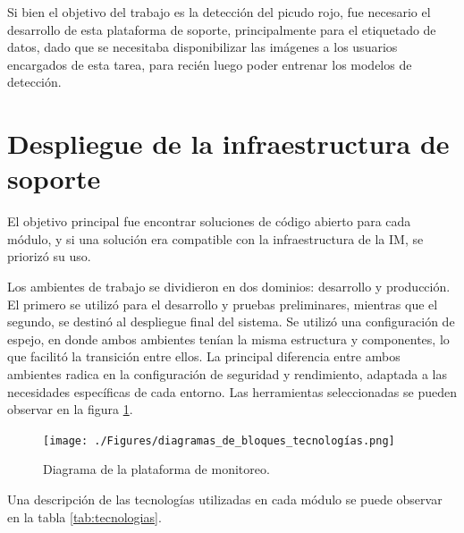 Si bien el objetivo del trabajo es la detección del picudo rojo, fue necesario el desarrollo de esta plataforma de soporte, principalmente para el etiquetado de datos, dado que se necesitaba disponibilizar las imágenes a los usuarios encargados de esta tarea, para recién luego poder entrenar los modelos de detección.


\section{Despliegue de la infraestructura de soporte}
\label{sec:despliegue_infraestructura}


El objetivo principal fue encontrar soluciones de código abierto para cada módulo, y si una solución era compatible con la infraestructura de la IM, se priorizó su uso.

Los ambientes de trabajo se dividieron en dos dominios: desarrollo y producción. El primero se utilizó para el desarrollo y pruebas preliminares, mientras que el segundo, se destinó al despliegue final del sistema. Se utilizó una configuración de espejo, en donde ambos ambientes tenían la misma estructura y componentes, lo que facilitó la transición entre ellos. La principal diferencia entre ambos ambientes radica en la configuración de seguridad y rendimiento, adaptada a las necesidades específicas de cada entorno. Las herramientas seleccionadas se pueden observar en la figura \ref{fig:infra-desarrollo}.

\begin{figure}[H]
  \centering
  \texttt{[image: ./Figures/diagramas\_de\_bloques\_tecnologías.png]}
  \caption{Diagrama de la plataforma de monitoreo.}
  \label{fig:infra-desarrollo}
\end{figure}

Una descripción de las tecnologías utilizadas en cada módulo se puede observar en la tabla \ref{tab:tecnologias}.

